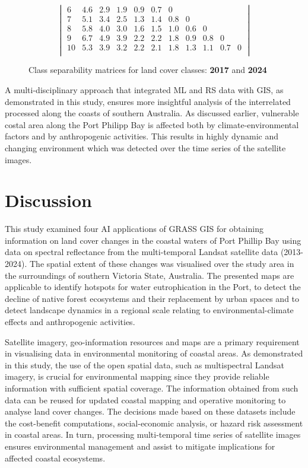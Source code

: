 \documentclass[jmse,article,submit,pdftex,moreauthors]{Definitions/mdpi}
\begin{document}
\begin{figure}[H]
\begin{equation}
\begin{vmatrix}
6 & 4.6 & 2.9 & 1.9 & 0.9 & 0.7 & 0 &  &  &  &  \\
7 & 5.1 & 3.4 & 2.5 & 1.3 & 1.4 & 0.8 & 0 &  &  &  \\ 
8 & 5.8 & 4.0 & 3.0 & 1.6 & 1.5 & 1.0 & 0.6 & 0 &  &  \\
9 & 6.7 & 4.9 & 3.9 & 2.2 & 2.2 & 1.8 & 0.9 & 0.8 & 0 &  \\  
10 & 5.3 & 3.9 & 3.2 & 2.2 & 2.1 & 1.8 & 1.3 & 1.1 & 0.7 & 0 \\   
\end{vmatrix} 
\end{equation}
\caption{Class separability matrices for land cover classes: \textbf{2017} and \textbf{2024}}
\label{fig13}
\end{figure}

A multi-disciplinary approach that integrated ML and RS data with GIS, as demonstrated in this study, ensures more insightful analysis of the interrelated processed along the coasts of southern Australia. As discussed earlier, vulnerable costal area along the Port Philipp Bay is affected both by climate-environmental factors and by anthropogenic activities. This results in highly dynamic and changing environment which was detected over the time series of the satellite images. 

\section{Discussion}

This study examined four AI applications of GRASS GIS for obtaining information on land cover changes in the coastal waters of Port Phillip Bay using data on spectral reflectance from the multi-temporal Landsat satellite data (2013-2024). The spatial extent of these changes was visualised over the study area in the surroundings of southern Victoria  State, Australia. The presented maps are applicable to identify hotspots for water eutrophication in the Port, to detect the decline of native forest ecosystems and their replacement by urban spaces and to detect landscape dynamics in a regional scale relating to environmental-climate effects and anthropogenic activities. 

Satellite imagery, geo-information resources and maps are a primary requirement in visualising data in environmental monitoring of coastal areas. As demonstrated in this study, the use of the open spatial data, such as multispectral Landsat imagery, is crucial for environmental mapping since they provide reliable information with sufficient spatial coverage. The information obtained from such data can be reused for updated coastal mapping and operative monitoring to analyse land cover changes. The decisions made based on these datasets include the cost-benefit computations, social-economic analysis, or hazard risk assessment in coastal areas. In turn, processing multi-temporal time series of satellite images ensures environmental management and assist to mitigate implications for affected coastal ecosystems.
\end{document}
